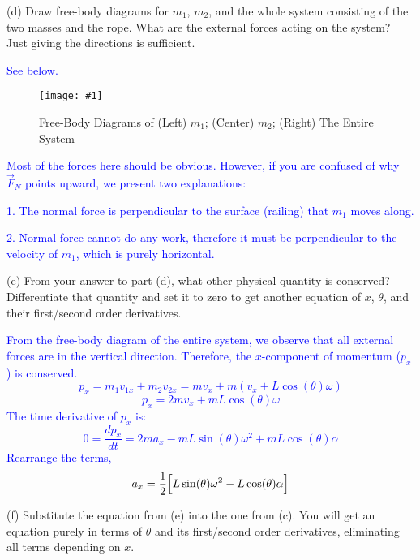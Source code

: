 \documentclass[11pt]{article}
\newcommand{\fig}[4]{
    \begin{figure}[H]
        \centering
        \texttt{[image: \#1]}
        \caption{#2}
        \label{exp4fit}
    \end{figure}
}
\theoremstyle{gangnamstyle}{\newtheorem{definition}{Definition}[]}
\theoremstyle{gangnamstyle}{\newtheorem{example}{Example}[]}
\theoremstyle{gangnamstyle}{\newtheorem{problem}{Problem}[]}
\begin{document}
\pagebreak

(d) Draw free-body diagrams for $m_1$, $m_2$, and the whole system consisting of the two masses and the rope. What are the external forces acting on the system? Just giving the directions is sufficient. 

\textcolor{blue}{See below.}

\fig{figs/caps/fbd.jpeg}{Free-Body Diagrams of (Left) $m_1$; (Center) $m_2$; (Right) The Entire System}{0.125}{0}

\textcolor{blue}{Most of the forces here should be obvious. However, if you are confused of why $\Vec{F}_N$ points upward, we present two explanations:}

\textcolor{blue}{1. The normal force is perpendicular to the surface (railing) that $m_1$ moves along.}

\textcolor{blue}{2. Normal force cannot do any work, therefore it must be perpendicular to the velocity of $m_1$, which is purely horizontal.}

(e) From your answer to part (d), what other physical quantity is conserved? Differentiate that quantity and set it to zero to get another equation of $x$, $\theta$, and their first/second order derivatives. 

\textcolor{blue}{From the free-body diagram of the entire system, we observe that all external forces are in the vertical direction. Therefore, the $x$-component of momentum ($p_x$) is conserved. 
\[ p_x = m_1v_{1x} + m_2v_{2x} = mv_x + m(v_x + L\cos(\theta)\omega) \]
\[ p_x = 2mv_x + mL\cos(\theta)\omega \]
The time derivative of $p_x$ is:
\[ 0 = \frac{dp_x}{dt} = 2ma_x - mL\sin(\theta)\omega^2 + mL\cos(\theta)\alpha \]
Rearrange the terms,
\begin{equation}
a_x = \frac{1}{2}\Bigl[ L\sin(\theta)\omega^2 - L\cos(\theta)\alpha \Bigr]
\end{equation}}

\pagebreak

(f) Substitute the equation from (e) into the one from (c). You will get an equation purely in terms of $\theta$ and its first/second order derivatives, eliminating all terms depending on $x$. 
\end{document}
